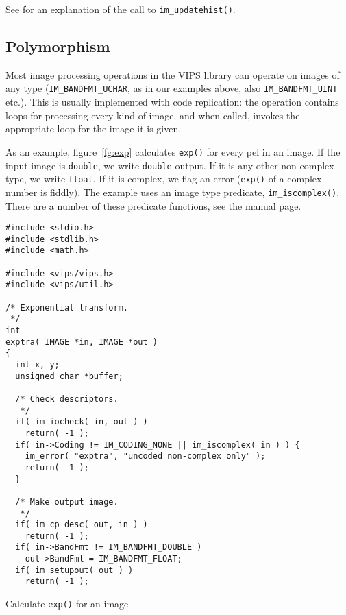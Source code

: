 See  for an explanation of the call to \verb+im_updatehist()+.

\subsection{Polymorphism}
\label{sec:poly}

Most image processing operations in the VIPS library can operate on
images of any type (\verb+IM_BANDFMT_UCHAR+, as in our examples above,
also \verb+IM_BANDFMT_UINT+ etc.). This is usually implemented with code
replication: the operation contains loops for processing every kind of image,
and when called, invokes the appropriate loop for the image it is given.

As an example, figure~\ref{fg:exp} calculates \verb+exp()+ for every pel
in an image. If the input image is \verb+double+, we write \verb+double+
output. If it is any other non-complex type, we write \verb+float+. If it
is complex, we flag an error (\verb+exp()+ of a complex number is fiddly).
The example uses an image type predicate, \verb+im_iscomplex()+. There are
a number of these predicate functions, see the manual page.

\begin{fig2}
\begin{verbatim}
#include <stdio.h>
#include <stdlib.h>
#include <math.h>

#include <vips/vips.h>
#include <vips/util.h>

/* Exponential transform.
 */
int
exptra( IMAGE *in, IMAGE *out )
{
  int x, y;
  unsigned char *buffer;

  /* Check descriptors.
   */
  if( im_iocheck( in, out ) )
    return( -1 );
  if( in->Coding != IM_CODING_NONE || im_iscomplex( in ) ) {
    im_error( "exptra", "uncoded non-complex only" );
    return( -1 );
  }

  /* Make output image.
   */
  if( im_cp_desc( out, in ) )
    return( -1 );
  if( in->BandFmt != IM_BANDFMT_DOUBLE )
    out->BandFmt = IM_BANDFMT_FLOAT;
  if( im_setupout( out ) )
    return( -1 );
\end{verbatim}
\caption{Calculate \texttt{exp()} for an image}
\label{fg:exp}
\end{fig2}


